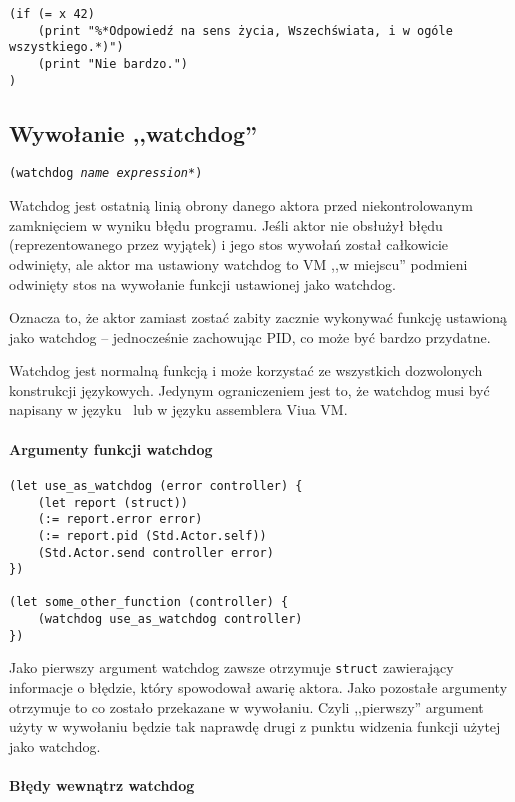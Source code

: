 \begin{lstlisting}
(if (= x 42)
    (print "%*Odpowiedź na sens życia, Wszechświata, i w ogóle wszystkiego.*)")
    (print "Nie bardzo.")
)
\end{lstlisting}

\subsection{Wywołanie ,,watchdog''}
\label{viuact_spec_watchdog_call}

\texttt{(watchdog \emph{name} \emph{expression}*)}
\newline

Watchdog jest ostatnią linią obrony danego aktora przed niekontrolowanym zamknięciem w wyniku błędu programu.
Jeśli aktor nie obsłużył błędu (reprezentowanego przez wyjątek) i jego stos wywołań został całkowicie
odwinięty, ale aktor ma ustawiony watchdog to VM ,,w miejscu'' podmieni odwinięty stos na wywołanie funkcji
ustawionej jako watchdog.

Oznacza to, że aktor zamiast zostać zabity zacznie wykonywać funkcję ustawioną jako watchdog -- jednocześnie
zachowując PID, co może być bardzo przydatne.

Watchdog jest normalną funkcją i może korzystać ze wszystkich dozwolonych konstrukcji językowych.
Jedynym ograniczeniem jest to, że watchdog musi być napisany w języku \ViuAct\ lub w języku assemblera Viua VM.

\paragraph*{Argumenty funkcji watchdog}

\begin{lstlisting}
(let use_as_watchdog (error controller) {
    (let report (struct))
    (:= report.error error)
    (:= report.pid (Std.Actor.self))
    (Std.Actor.send controller error)
})

(let some_other_function (controller) {
    (watchdog use_as_watchdog controller)
})
\end{lstlisting}

Jako pierwszy argument watchdog zawsze otrzymuje \texttt{struct} zawierający informacje o błędzie, który
spowodował awarię aktora. Jako pozostałe argumenty otrzymuje to co zostało przekazane w wywołaniu.
Czyli ,,pierwszy'' argument użyty w wywołaniu będzie tak naprawdę drugi z punktu widzenia funkcji użytej jako
watchdog.

\paragraph*{Błędy wewnątrz watchdog}

